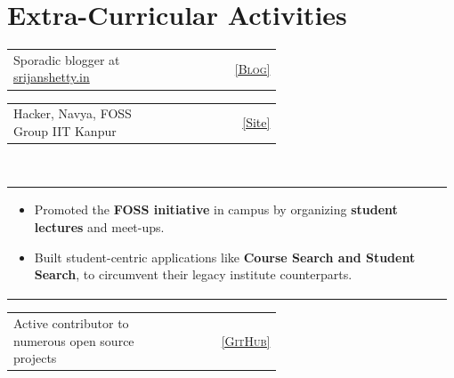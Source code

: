\documentclass[a4paper]{article} %
\newcommand{\verticalspacing}{-0.25cm}
\newcommand{\headspace}{-0.3cm}
\newcommand{\bulletspace}{0.7cm}
\newcommand{\projectheadspacing}{6.9cm}
\newcommand{\gitproject}[3]{%
    \begin{tabular}{p{0.60\linewidth}r}
        \textcolor{NavyBlue}{\small #2} & \multicolumn{1}{m{ \projectheadspacing{} }}{\raggedleft #1}\\
    \end{tabular}\\
    \begin{tabular}{p{0.98\linewidth}}
        \vspace{\headspace{}}
        \small{#3}
    \end{tabular}
    \vspace{\verticalspacing{}}
    \vspace{-0.2cm} %
}
\newcommand{\skill}[2]{%
    \begin{tabular}{p{0.60\linewidth}r}
        \small {#2} & \multicolumn{1}{m{ \projectheadspacing{} }}{\raggedleft \textsc{\small #1}}\\
    \end{tabular}
    \vspace{\verticalspacing{}}
}
\begin{document}
\section{Extra-Curricular Activities}

\skill {\href{srijanshetty.quora.com} {[Blog]}}
       {Sporadic blogger at \href{srijanshetty.in} {srijanshetty.in}}

\gitproject
    {\href{https://github.com/navya} {\small{[Site]}}}
    {Hacker, Navya, FOSS Group IIT Kanpur}
    {%
        \begin{itemize}[leftmargin=\bulletspace{}]
            \item Promoted the \textbf{FOSS initiative} in campus by organizing \textbf{student lectures} and meet-ups.
            \item Built student-centric applications like \textbf{Course Search and Student Search}, to circumvent
                their legacy institute counterparts.
        \end{itemize}
    }

\skill
    {\href{https://github.com/srijanshetty} {\small{[GitHub]}}}
    {Active contributor to numerous open source projects}
\end{document}
